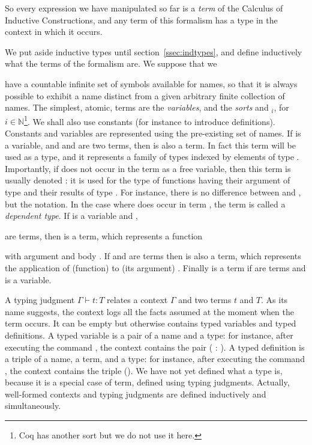 So every expression we have manipulated so far is a \emph{term} of the
Calculus of Inductive Constructions, and any term of this formalism
has a type in the context in which it occurs.


We put aside inductive types until section~\ref{ssec:indtypes}, and define
inductively what the terms of the formalism are. We suppose that we

have a countable infinite set of symbols available for names, so that it is
always possible to exhibit a name distinct from a given arbitrary
finite collection of names. The simplest, atomic, terms are the
\emph{variables}, and the \emph{sorts}  and $_i$, for
$i \in \mathbb{N}$\footnote{Coq has
another sort  but we do not use it here.}. We shall also
use constants (for instance to introduce definitions). Constants and
variables are represented using the pre-existing set of names. If  is a
variable, and  and  are two terms, then  is
also a term. In fact this term will be used as a type, and it
represents a family of types  indexed by elements of type .
Importantly, if  does not occur in the term  as a
free variable, then this term is usually denoted : it is
used for the type of functions having their argument of type  and
their results of type . For instance, there is no difference
between  and , but the
notation. In the case where  does occur in term , the term
 is called a \emph{dependent type}.
If  is a variable and , 

are terms, then  is a term, which represents a function

with argument  and body . If  and  are terms then
 is also a term, which represents the application of (function)
 to (its argument) . Finally  is a term
if  are terms and  is a variable.

A typing judgment $\Gamma \vdash t : T$ relates a
context $\Gamma$ and two terms $t$ and $T$. As its name suggests,
the context logs all the facts assumed at the moment when the term
occurs. It can be empty but otherwise contains typed variables and
typed definitions. A typed variable is a pair of a name and a
type: for instance, after executing the command ,
the context contains the pair ( : ). A typed definition is
a triple of a name, a term, and a type: for instance, after executing
the command , the context contains the
triple (). We have not yet defined what a
type is, because it is a special case of term, defined using typing
judgments. Actually, well-formed contexts and typing judgments are
defined inductively and simultaneously.

